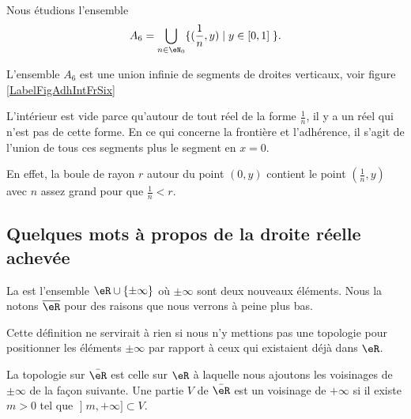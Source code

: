 \begin{example}\label{ItemexoEspVectoNorme0003iv}
	Nous étudions l'ensemble
	\begin{equation}
		A_6 = \bigcup _{ n \in \eN_0} \{ ( \frac 1n, y ) \; | \; y \in [0,1] \; \}.
	\end{equation}

	L'ensemble \( A_6\) est une union infinie de segments de droites verticaux, voir figure \ref{LabelFigAdhIntFrSix}
	\newcommand{\CaptionFigAdhIntFrSix}{Le segment sur l'axe vertical entre \( y=0\) et \( y=1\) fait partie de l'adhérence et de la frontière, mais pas de l'ensemble \( A_6\) lui-même.}
	
	L'intérieur est vide parce qu'autour de tout réel de la forme \( \frac{1}{ n }\), il y a un réel qui n'est pas de cette forme. En ce qui concerne la frontière et l'adhérence, il s'agit de l'union de tous ces segments plus le segment en \( x=0\).

	En effet, la boule de rayon \( r\) autour du point \( (0,y)\) contient le point \( (\frac{1}{ n },y)\) avec \( n\) assez grand pour que \( \frac{1}{ n }<r\).
\end{example}


\subsection{Quelques mots à propos de la droite réelle achevée}

\begin{definition}
	La  est l'ensemble \( \eR\cup\{ \pm \infty \}\) où \( \pm\infty\) sont deux nouveaux éléments. Nous la notons \( \overline{ \eR }\) pour des raisons que nous verrons à peine plus bas.
\end{definition}

Cette définition ne servirait à rien si nous n'y mettions pas une topologie pour positionner les éléments \( \pm\infty\) par rapport à ceux qui existaient déjà dans \( \eR\).

\begin{definition}
	La topologie sur \(\bar \eR\) est celle sur \( \eR\) à laquelle nous ajoutons les voisinages de \( \pm\infty\) de la façon suivante. Une partie \( V\) de \( \bar \eR\) est un voisinage de \( +\infty\) si il existe \( m>0\) tel que \( \mathopen] m , +\infty \mathclose]\subset V\).
\end{definition}

